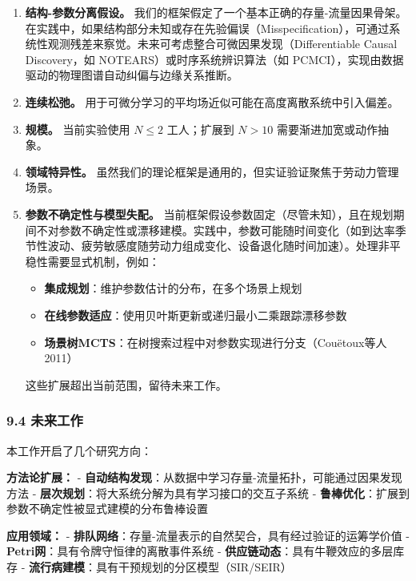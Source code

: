 \documentclass[UTF8]{ctexart}
\providecommand{\tightlist}{%
  \setlength{\itemsep}{0pt}\setlength{\parskip}{0pt}}
\begin{document}
\begin{enumerate}
\def\labelenumi{\arabic{enumi}.}
\item
  \textbf{结构-参数分离假设。}
  我们的框架假定了一个基本正确的存量-流量因果骨架。在实践中，如果结构部分未知或存在先验偏误（Misspecification），可通过系统性观测残差来察觉。未来可考虑整合可微因果发现（Differentiable Causal Discovery，如 NOTEARS）或时序系统辨识算法（如 PCMCI），实现由数据驱动的物理图谱自动纠偏与边缘关系推断。
\item
  \textbf{连续松弛。}
  用于可微分学习的平均场近似可能在高度离散系统中引入偏差。
\item
  \textbf{规模。} 当前实验使用 \(N \leq 2\) 工人；扩展到 \(N > 10\)
  需要渐进加宽或动作抽象。
\item
  \textbf{领域特异性。}
  虽然我们的理论框架是通用的，但实证验证聚焦于劳动力管理场景。
\item
  \textbf{参数不确定性与模型失配。}
  当前框架假设参数固定（尽管未知），且在规划期间不对参数不确定性或漂移建模。实践中，参数可能随时间变化（如到达率季节性波动、疲劳敏感度随劳动力组成变化、设备退化随时间加速）。处理非平稳性需要显式机制，例如：

  \begin{itemize}
  \tightlist
  \item
    \textbf{集成规划}：维护参数估计的分布，在多个场景上规划
  \item
    \textbf{在线参数适应}：使用贝叶斯更新或递归最小二乘跟踪漂移参数
  \item
    \textbf{场景树MCTS}：在树搜索过程中对参数实现进行分支（Couëtoux等人
    2011）
  \end{itemize}

  这些扩展超出当前范围，留待未来工作。
\end{enumerate}

\hypertarget{ux672aux6765ux5de5ux4f5c}{%
\subsubsection{9.4 未来工作}\label{ux672aux6765ux5de5ux4f5c}}

本工作开启了几个研究方向：

\textbf{方法论扩展：} -
\textbf{自动结构发现}：从数据中学习存量-流量拓扑，可能通过因果发现方法 -
\textbf{层次规划}：将大系统分解为具有学习接口的交互子系统 -
\textbf{鲁棒优化}：扩展到参数不确定性被显式建模的分布鲁棒设置

\textbf{应用领域：} -
\textbf{排队网络}：存量-流量表示的自然契合，具有经过验证的运筹学价值 -
\textbf{Petri网}：具有令牌守恒律的离散事件系统 -
\textbf{供应链动态}：具有牛鞭效应的多层库存 -
\textbf{流行病建模}：具有干预规划的分区模型（SIR/SEIR）
\end{document}
